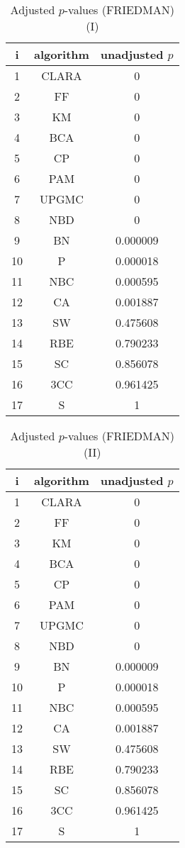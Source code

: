 \documentclass[a4paper,10pt]{article}
\begin{document}
\begin{landscape}
\begin{table}[!htp]
\centering\small
\begin{tabular}{ccc}
i&algorithm&unadjusted $p$\\
\hline1&CLARA&0\\2&FF&0\\3&KM&0\\4&BCA&0\\5&CP&0\\6&PAM&0\\7&UPGMC&0\\8&NBD&0\\9&BN&0.000009\\10&P&0.000018\\11&NBC&0.000595\\12&CA&0.001887\\13&SW&0.475608\\14&RBE&0.790233\\15&SC&0.856078\\16&3CC&0.961425\\17&S&1\\\hline
\end{tabular}
\caption{Adjusted $p$-values (FRIEDMAN) (I)}
\end{table}
\begin{table}[!htp]
\centering\small
\begin{tabular}{ccc}
i&algorithm&unadjusted $p$\\
\hline1&CLARA&0\\2&FF&0\\3&KM&0\\4&BCA&0\\5&CP&0\\6&PAM&0\\7&UPGMC&0\\8&NBD&0\\9&BN&0.000009\\10&P&0.000018\\11&NBC&0.000595\\12&CA&0.001887\\13&SW&0.475608\\14&RBE&0.790233\\15&SC&0.856078\\16&3CC&0.961425\\17&S&1\\\hline
\end{tabular}
\caption{Adjusted $p$-values (FRIEDMAN) (II)}
\end{table}

\newpage
\end{landscape}
\end{document}
